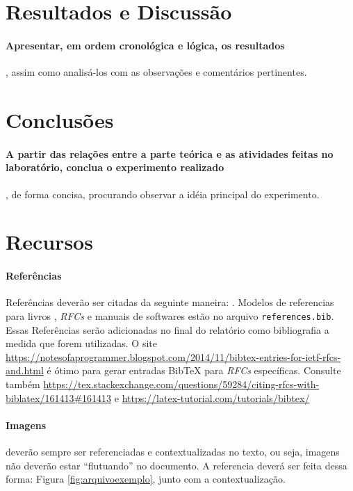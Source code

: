 \documentclass[10pt, a4paper]{article}
\begin{document}
    \section{Resultados e Discussão}

    \paragraph{Apresentar, em ordem cronológica e lógica, os resultados}, assim como analisá-los com as observações e comentários pertinentes. 

    \section{Conclusões}

    \paragraph{A partir das relações entre a parte teórica e as atividades feitas no laboratório, conclua o experimento realizado}, de forma concisa, procurando observar a idéia principal do experimento.

    
    \section{Recursos}
    
    \paragraph{Referências}
    Referências deverão ser citadas da seguinte maneira: \cite{kurose_ross_2022}. Modelos de referencias para livros \cite{kurose_ross_2022}, \textit{RFCs} \cite{RFC0791} e manuais de softwares \cite{ping} estão no arquivo \texttt{references.bib}. Essas Referências serão adicionadas no final do relatório como bibliografia a medida que forem utilizadas. O site \url{https://notesofaprogrammer.blogspot.com/2014/11/bibtex-entries-for-ietf-rfcs-and.html} é ótimo para gerar entradas BibTeX para \textit{RFCs} específicas. Consulte também \url{https://tex.stackexchange.com/questions/59284/citing-rfcs-with-biblatex/161413#161413} e \url{https://latex-tutorial.com/tutorials/bibtex/}

    

    \paragraph{Imagens} deverão sempre ser referenciadas e contextualizadas no texto, ou seja, imagens não deverão estar ``flutuando'' no documento. A referencia deverá ser feita dessa forma: Figura \ref{fig:arquivoexemplo}, junto com a contextualização.
\end{document}
